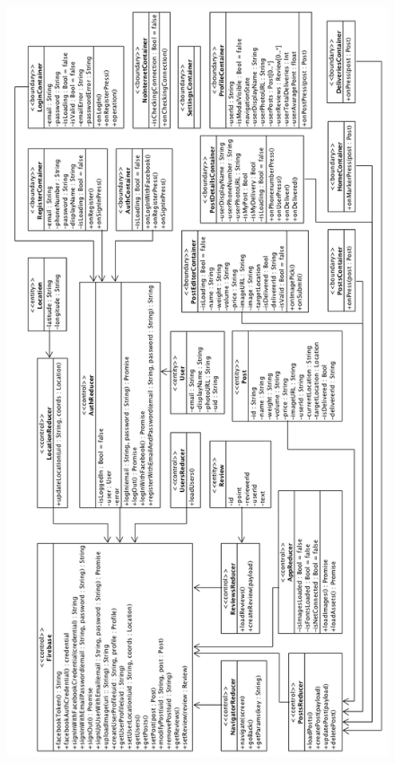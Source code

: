 \begin{figure}[H]
    \centering
	\includegraphics[height=.88\textheight]{Figures/zohiomj/upgraded_class.png}
\end{figure}


